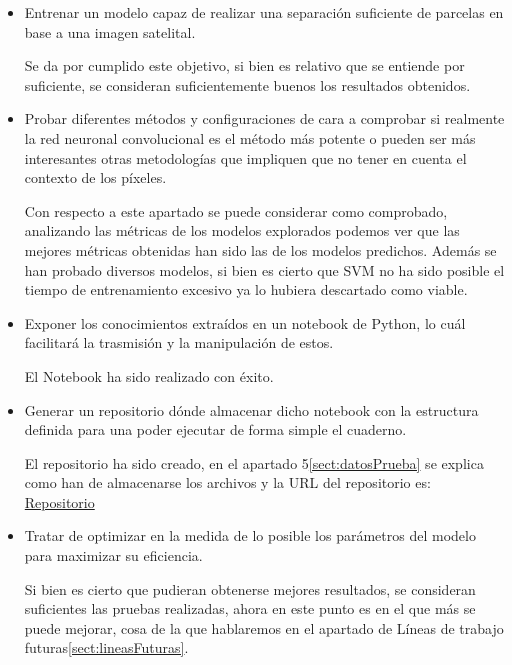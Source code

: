 \begin{itemize}
	\item Entrenar un modelo capaz de realizar una separación suficiente de parcelas en base a una imagen satelital. 
	
	Se da por cumplido este objetivo, si bien es relativo que se entiende por suficiente, se consideran suficientemente buenos los resultados obtenidos.
	
	\item Probar diferentes métodos y configuraciones de cara a comprobar si realmente la red neuronal convolucional es el método más potente o pueden ser más interesantes otras metodologías que impliquen que no tener en cuenta el contexto de los píxeles.
	
	Con respecto a este apartado se puede considerar como comprobado, analizando las métricas de los modelos explorados podemos ver que las mejores métricas obtenidas han sido las de los modelos predichos. Además se han probado diversos modelos, si bien es cierto que SVM no ha sido posible el tiempo de entrenamiento excesivo ya lo hubiera descartado como viable.
	
	\item Exponer los conocimientos extraídos en un notebook de Python, lo cuál facilitará la trasmisión y la manipulación de estos.
	
	El Notebook ha sido realizado con éxito.
	
	\item Generar un repositorio dónde almacenar dicho notebook con la estructura definida para una poder ejecutar de forma simple el cuaderno.
	
	El repositorio ha sido creado, en el apartado 5\ref{sect:datosPrueba} se explica como han de almacenarse los archivos y la URL del repositorio es: 
	\href{https://github.com/wgm1001/Trabajo_fin_master_deteccion_bordes}{Repositorio} 
	
	\item Tratar de optimizar en la medida de lo posible los parámetros del modelo para maximizar su eficiencia.
	
	Si bien es cierto que pudieran obtenerse mejores resultados, se consideran suficientes las pruebas realizadas, ahora en este punto es en el que más se puede mejorar, cosa de la que hablaremos en el apartado de Líneas de trabajo futuras\ref{sect:lineasFuturas}.
		
\end{itemize}

